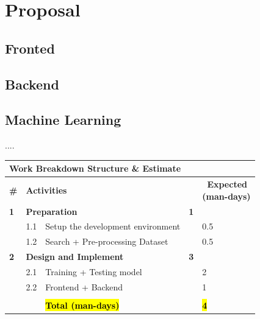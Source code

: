 \newpage
\section{Proposal}
\subsection{Fronted}
\subsection{Backend}
\subsection{Machine Learning}

....

\begin{table}[h]
\begin{tabular}{|m{0.3cm}|m{1.0cm}|m{9.7cm}|m{1.6cm}|m{2.4cm}|}
\hline
\multicolumn{5}{|m{17cm}|}{\cellcolor{red!25} \large\textbf{Work Breakdown Structure \& Estimate}} 
\\
\hline
\textbf{\#} & \multicolumn{3}{|m{12.3cm}|}{\textbf{Activities}} & \pbox{2.4cm}{\textbf{~Expected} \\ \textbf{(man-days)}}
\\
\hline
\textbf{1} & \multicolumn{2}{|m{10.7cm}|}{\textbf{Preparation}} & \textbf{1} & 
\\
\hline
& 1.1 & Setup the development environment & & 0.5
\\
\hline
& 1.2 & Search + Pre-processing Dataset & & 0.5
\\
\hline
\textbf{2} & \multicolumn{2}{|m{10.7cm}|}{\textbf{Design and Implement}} & \textbf{3} &
\\
\hline 
& 2.1 & Training + Testing model & & 2
\\
\hline
& 2.2 & Frontend + Backend & & 1
\\
\hline
\multicolumn{2}{|m{1.3cm}|}{} & \multicolumn{2}{m{11.3cm}|}{} &
\\
\hline
\multicolumn{2}{|m{1.3cm}|}{} & \multicolumn{2}{m{11.3cm}|}{\hl{\textbf{Total (man-days)}}} & \hl{\textbf{4}}
\\
\hline

\end{tabular}%
\end{table}

